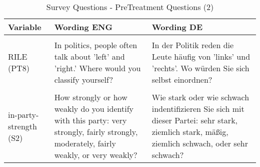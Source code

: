 \documentclass[]{article}
\begin{document}
\begin{table}[!h]
\begin{tabular}[t]{>{\raggedright\arraybackslash}p{3cm}>{\raggedright\arraybackslash}p{7cm}>{\raggedright\arraybackslash}p{7cm}}
\addlinespace
\cellcolor{gray!6}{political-knowledge3 (PT6)} & \cellcolor{gray!6}{And can you say approximately what the current unemployment rate is in Germany? Is it lower or higher than 10 percent?} & \cellcolor{gray!6}{Und können Sie ungefähr sagen, wie hoch die derzeitige Arbeitslosenquote in Deutschland ist? Ist sie niedriger oder höher als 10 Prozent?}\\
\bottomrule
\end{tabular}
\end{table}

\begin{table}[!h]

\caption{\label{tab:pret}\label{tab:pret2}Survey Questions - PreTreatment Questions (2)}
\centering
\begin{tabular}[t]{>{\raggedright\arraybackslash}p{3cm}>{\raggedright\arraybackslash}p{7cm}>{\raggedright\arraybackslash}p{7cm}}
\toprule
Variable & Wording ENG & Wording DE\\
\midrule
\cellcolor{gray!6}{political-interest (PT7)} & \cellcolor{gray!6}{Once speaking in general terms: How interested are you in politics - very strongly, strongly, moderately, less strongly, or not at all?} & \cellcolor{gray!6}{Einmal ganz allgemein gesprochen: Wie stark interessieren Sie sich für Politik – sehr stark, stark, mittelmäßig, weniger stark oder überhaupt nicht?}\\
RILE (PT8) & In politics, people often talk about 'left' and 'right.' Where would you classify yourself? & In der Politik reden die Leute häufig von 'links' und 'rechts'. Wo würden Sie sich selbst einordnen?\\
\cellcolor{gray!6}{in-party (S1)} & \cellcolor{gray!6}{If you had to choose, which of the following parties would you be most likely to vote for in the next federal election?} & \cellcolor{gray!6}{Wenn Sie sich entscheiden müssten, welche der folgenden Parteien würden Sie bei der nächsten Bundestagswahl am ehesten wählen?}\\
in-party-strength (S2) & How strongly or how weakly do you identify with this party: very strongly, fairly strongly, moderately, fairly weakly, or very weakly? & Wie stark oder wie schwach indentifizieren Sie sich mit dieser Partei: sehr stark, ziemlich stark, mäßig, ziemlich schwach, oder sehr schwach?\\
\bottomrule
\end{tabular}
\end{table}
\end{document}
